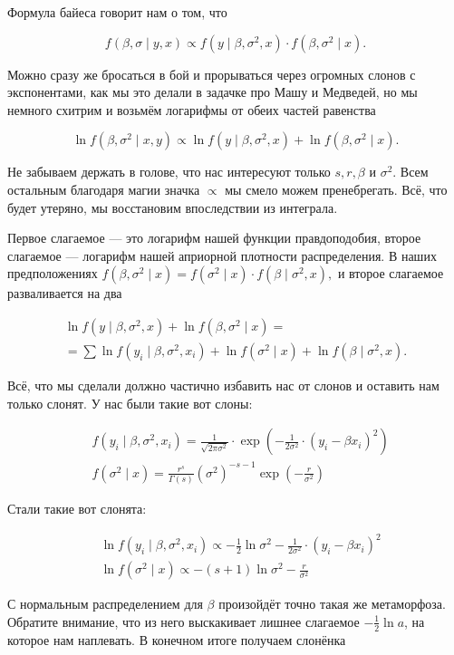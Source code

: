 \documentclass[12pt, a4paper, oneside]{extreport}
\def \b{\beta}
\newcommand{\expp}[1]{ \exp \left( #1 \right)}
\theoremstyle{plain}              %
\theoremstyle{definition}         %
\begin{document}
Формула байеса говорит нам о том, что 

\[ f(\beta, \sigma \mid y,x) \propto f(y \mid \beta, \sigma^2, x) \cdot f(\beta, \sigma^2 \mid x).\] 

Можно сразу же бросаться в бой и прорываться через огромных слонов с экспонентами, как мы это делали в задачке про Машу и Медведей, но мы немного схитрим и возьмём логарифмы от обеих частей равенства

\[ \ln f(\b, \sigma^2 \mid x,y)  \propto \ln f(y \mid  \b, \sigma^2, x) + \ln f(\b, \sigma^2 \mid x). \] 

Не забываем держать в голове, что нас интересуют только $s,r,\b$ и $\sigma^2$. Всем остальным благодаря магии значка $\propto$ мы смело можем пренебрегать. Всё, что будет утеряно, мы восстановим впоследствии из интеграла. 

Первое слагаемое --- это логарифм нашей функции правдоподобия, второе слагаемое --- логарифм нашей априорной плотности распределения. В наших предположениях $f(\beta,\sigma^2 \mid x) = f(\sigma^2 \mid x) \cdot f(\beta \mid \sigma^2, x),$ и второе слагаемое разваливается на два

\begin{multline*}
\ln f(y \mid  \b, \sigma^2, x) + \ln f(\b, \sigma^2 \mid x) = \\ = \sum \ln f(y_i \mid \b, \sigma^2,x_i) + \ln   f(\sigma^2 \mid x) + \ln f(\beta \mid \sigma^2,x).
\end{multline*}

Всё, что мы сделали должно частично избавить нас от слонов и оставить нам только слонят. У нас были такие вот слоны: 

\begin{align*}
 &f(y_i \mid \b, \sigma^2, x_i) = \frac{1}{\sqrt{2 \pi \sigma^2}} \cdot \expp{-\frac{1}{2\sigma^2} \cdot (y_i - \b x_i)^2} \\ 
 &f(\sigma^2 \mid x) = \frac{r^s}{\Gamma(s)} (\sigma^2)^{-s-1} \expp{-\frac{r}{\sigma^2}} 
 \end{align*}

Стали такие вот слонята: 

\begin{align*}
& \ln f(y_i \mid \b, \sigma^2, x_i) \propto -\frac{1}{2} \ln \sigma^2 - \frac{1}{2 \sigma^2} \cdot(y_i-\b x_i)^2 \\
& \ln f(\sigma^2 \mid x) \propto -(s+1) \ln \sigma^2 - \frac{r}{\sigma^2}
\end{align*}

С нормальным распределением для $\b$ произойдёт точно такая же метаморфоза. Обратите внимание, что из него выскакивает лишнее слагаемое $-\frac{1}{2} \ln a$, на которое нам наплевать. В конечном итоге получаем слонёнка
\end{document}
